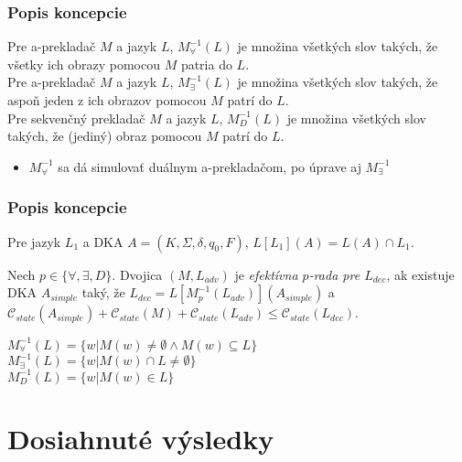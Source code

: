 \documentclass[slovak]{beamer}
\begin{document}
\begin{frame}
\frametitle{Popis koncepcie}

\begin{definition}
Pre a-prekladač $M$ a jazyk $L$, $M_{\forall}^{-1}(L)$ je množina všetkých slov takých, že všetky ich obrazy pomocou $M$ patria do $L$.\\
Pre a-prekladač $M$ a jazyk $L$, $M_{\exists}^{-1}(L)$ je množina všetkých slov takých, že aspoň jeden z ich obrazov pomocou $M$ patrí do $L$.\\
Pre sekvenčný prekladač $M$ a jazyk $L$, $M_D^{-1}(L)$ je množina všetkých slov takých, že (jediný) obraz pomocou $M$ patrí do $L$.
\end{definition}

\begin{itemize}
\item $M_{\forall}^{-1}$ sa dá simulovať duálnym a-prekladačom, po úprave aj $M_{\exists}^{-1}$
\end{itemize}

\end{frame}

\begin{frame}
\frametitle{Popis koncepcie}

\begin{definition}
Pre jazyk $L_1$ a DKA $A = (K, \Sigma, \delta, q_0, F)$, $L[L_1](A) = L(A) \cap L_1$.
\end{definition}

\begin{definition}
Nech $p \in \{\forall, \exists, D\}$. Dvojica $(M, L_{adv})$ je \emph{efektívna $p$-rada pre $L_{dec}$}, ak existuje DKA $A_{simple}$ taký, že $L_{dec} = L[M_p^{-1}(L_{adv})](A_{simple})$ a $\mathcal{C}_{state}(A_{simple}) + \mathcal{C}_{state}(M) + \mathcal{C}_{state}(L_{adv}) \leq \mathcal{C}_{state}(L_{dec})$.
\end{definition}

\begin{definition}
$M_{\forall}^{-1}(L) = \{ w | M(w) \neq \emptyset \wedge M(w) \subseteq L \}$\\
$M_{\exists}^{-1}(L) = \{ w | M(w) \cap L \neq \emptyset\}$\\
$M_{D}^{-1}(L) = \{ w | M(w) \in L \}$
\end{definition}

\end{frame}

\section{Dosiahnuté výsledky}
\end{document}
